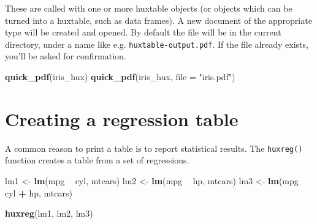 \documentclass[]{article}
\newenvironment{Shaded}{\begin{snugshade}}{\end{snugshade}}
\newcommand{\DataTypeTok}[1]{\textcolor[rgb]{0.13,0.29,0.53}{#1}}
\newcommand{\KeywordTok}[1]{\textcolor[rgb]{0.13,0.29,0.53}{\textbf{#1}}}
\newcommand{\NormalTok}[1]{#1}
\newcommand{\OperatorTok}[1]{\textcolor[rgb]{0.81,0.36,0.00}{\textbf{#1}}}
\newcommand{\StringTok}[1]{\textcolor[rgb]{0.31,0.60,0.02}{#1}}
\begin{document}
These are called with one or more huxtable objects (or objects which can
be turned into a huxtable, such as data frames). A new document of the
appropriate type will be created and opened. By default the file will be
in the current directory, under a name like e.g.
\texttt{huxtable-output.pdf}. If the file already exists, you'll be
asked for confirmation.

\begin{Shaded}
\begin{Highlighting}[]
\KeywordTok{quick_pdf}\NormalTok{(iris_hux) }
\KeywordTok{quick_pdf}\NormalTok{(iris_hux, }\DataTypeTok{file =} \StringTok{"iris.pdf"}\NormalTok{)}
\end{Highlighting}
\end{Shaded}

\FloatBarrier

\hypertarget{creating-a-regression-table}{%
\section{Creating a regression
table}\label{creating-a-regression-table}}

A common reason to print a table is to report statistical results. The
\texttt{huxreg()} function creates a table from a set of regressions.

\begin{Shaded}
\begin{Highlighting}[]
\NormalTok{lm1 <-}\StringTok{ }\KeywordTok{lm}\NormalTok{(mpg }\OperatorTok{~}\StringTok{ }\NormalTok{cyl, mtcars)}
\NormalTok{lm2 <-}\StringTok{ }\KeywordTok{lm}\NormalTok{(mpg }\OperatorTok{~}\StringTok{ }\NormalTok{hp, mtcars)}
\NormalTok{lm3 <-}\StringTok{ }\KeywordTok{lm}\NormalTok{(mpg }\OperatorTok{~}\StringTok{ }\NormalTok{cyl }\OperatorTok{+}\StringTok{ }\NormalTok{hp, mtcars)}

\KeywordTok{huxreg}\NormalTok{(lm1, lm2, lm3)}
\end{Highlighting}
\end{Shaded}

 
  \providecommand{\huxb}[2]{\arrayrulecolor[RGB]{#1}\global\arrayrulewidth=#2pt}
  \providecommand{\huxvb}[2]{\color[RGB]{#1}\vrule width #2pt}
  \providecommand{\huxtpad}[1]{\rule{0pt}{#1}}
  \providecommand{\huxbpad}[1]{\rule[-#1]{0pt}{#1}}
\end{document}
